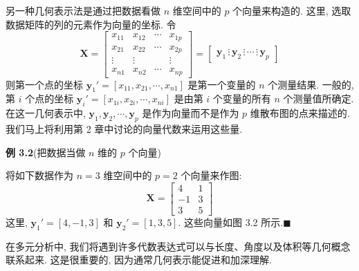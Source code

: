 另一种几何表示法是通过把数据看做 $n$ 维空间中的 $p$ 个向量来构造的. 这里, 选取数据矩阵的列的元素作为向量的坐标. 令
\label{eq:3-2}
\begin{equation}
\mathbf{X}=\begin{bmatrix}
x_{11}&x_{12}&\cdots&x_{1p}\\
x_{21}&x_{22}&\cdots&x_{2p}\\
\vdots&\vdots&&\vdots\\
x_{n1}&x_{n2}&\cdots&x_{np}
\end{bmatrix}
=\begin{bmatrix}\mathbf{y}_{1}\,\vdots\,\mathbf{y}_{2}\,\vdots\,\cdots\,\vdots\,\mathbf{y}_{p}\end{bmatrix}
\tag{3-2}
\end{equation}
则第一个点的坐标 $\mathbf{y}_{1}'=[x_{11},x_{21},\cdots,x_{n1}]$ 是第一个变量的 $n$ 个测量结果. 一般的, 第 $i$ 个点的坐标 $\mathbf{y}_{i}'=[x_{1i},x_{2i},\cdots,x_{ni}]$ 是由第 $i$ 个变量的所有 $n$ 个测量值所确定. 在这一几何表示中, $\mathbf{y}_{1},\mathbf{y}_{2},\cdots,\mathbf{y}_{p}$ 是作为向量而不是作为 $p$ 维散布图的点来描述的. 我们马上将利用第 2 章中讨论的向量代数来运用这些量.

\medskip
\noindent\textbf{例 3.2}\quad (把数据当做 $n$ 维的 $p$ 个向量)

将如下数据作为 $n=3$ 维空间中的 $p=2$ 个向量来作图:
\[
\mathbf{X}=\begin{bmatrix}4&1\\-1&3\\3&5\end{bmatrix}
\]
这里, $\mathbf{y}_{1}'=[4,-1,3]$ 和 $\mathbf{y}_{2}'=[1,3,5]$. 这些向量如图 3.2 所示.\hfill$\blacksquare$

在多元分析中, 我们将遇到许多代数表达式可以与长度、角度以及体积等几何概念联系起来. 这是很重要的, 因为通常几何表示能促进和加深理解.
